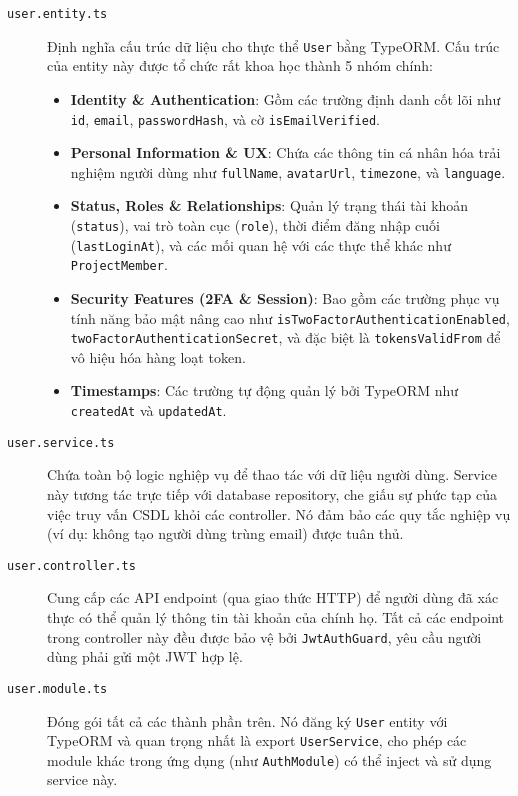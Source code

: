 \begin{description}
    \item[\texttt{user.entity.ts}] Định nghĩa cấu trúc dữ liệu cho thực thể \texttt{User} bằng TypeORM. Cấu trúc của entity này được tổ chức rất khoa học thành 5 nhóm chính:
    \begin{itemize}
        \item \textbf{Identity \& Authentication}: Gồm các trường định danh cốt lõi như \texttt{id}, \texttt{email}, \texttt{passwordHash}, và cờ \texttt{isEmailVerified}.
        \item \textbf{Personal Information \& UX}: Chứa các thông tin cá nhân hóa trải nghiệm người dùng như \texttt{fullName}, \texttt{avatarUrl}, \texttt{timezone}, và \texttt{language}.
        \item \textbf{Status, Roles \& Relationships}: Quản lý trạng thái tài khoản (\texttt{status}), vai trò toàn cục (\texttt{role}), thời điểm đăng nhập cuối (\texttt{lastLoginAt}), và các mối quan hệ với các thực thể khác như \texttt{ProjectMember}.
        \item \textbf{Security Features (2FA \& Session)}: Bao gồm các trường phục vụ tính năng bảo mật nâng cao như \texttt{isTwoFactorAuthenticationEnabled}, \texttt{twoFactorAuthenticationSecret}, và đặc biệt là \texttt{tokensValidFrom} để vô hiệu hóa hàng loạt token.
        \item \textbf{Timestamps}: Các trường tự động quản lý bởi TypeORM như \texttt{createdAt} và \texttt{updatedAt}.
    \end{itemize}
    
    \item[\texttt{user.service.ts}] Chứa toàn bộ logic nghiệp vụ để thao tác với dữ liệu người dùng. Service này tương tác trực tiếp với database repository, che giấu sự phức tạp của việc truy vấn CSDL khỏi các controller. Nó đảm bảo các quy tắc nghiệp vụ (ví dụ: không tạo người dùng trùng email) được tuân thủ.
    
    \item[\texttt{user.controller.ts}] Cung cấp các API endpoint (qua giao thức HTTP) để người dùng đã xác thực có thể quản lý thông tin tài khoản của chính họ. Tất cả các endpoint trong controller này đều được bảo vệ bởi \texttt{JwtAuthGuard}, yêu cầu người dùng phải gửi một JWT hợp lệ.
    
    \item[\texttt{user.module.ts}] Đóng gói tất cả các thành phần trên. Nó đăng ký \texttt{User} entity với TypeORM và quan trọng nhất là export \texttt{UserService}, cho phép các module khác trong ứng dụng (như \texttt{AuthModule}) có thể inject và sử dụng service này.
\end{description}

